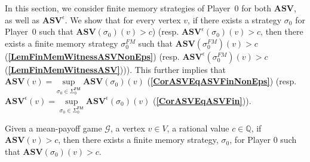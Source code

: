 In this section, we consider finite memory strategies of Player~$0$ for both $\mathbf{ASV}$, as well as $\mathbf{ASV}^\epsilon$.
We show that for every vertex $v$, if there exists a strategy $\sigma_0$ for Player~0 such that $\mathbf{ASV}(\sigma_0)(v) > c$) (resp. $\mathbf{ASV}^\epsilon(\sigma_0)(v) > c$, then there exists a finite memory strategy $\sigma_0^{FM}$ such that $\mathbf{ASV}(\sigma_0^{FM})(v) > c$ (\textbf{\cref{LemFinMemWitnessASVNonEps}}) (resp. $\mathbf{ASV}^\epsilon(\sigma_0^{FM})(v) > c$ (\textbf{\cref{LemFinMemWitnessASV}}))).
This further implies that $\mathbf{ASV}(v) = \sup\limits_{\sigma_0 \in \Sigma_0^{\mathsf{FM}}} \mathbf{ASV}(\sigma_0)(v)$ (\textbf{\cref{CorASVEqASVFinNonEps}}) (resp. $\mathbf{ASV}^\epsilon(v) = \sup\limits_{\sigma_0 \in \Sigma_0^{\mathsf{FM}}} \mathbf{ASV}^\epsilon(\sigma_0)(v)$ (\textbf{\cref{CorASVEqASVFin}})).
\begin{lemma}
\label{LemFinMemWitnessASVNonEps}
Given a mean-payoff game $\mathcal{G}$, a vertex $v \in V$, a rational value $c \in \mathbb{Q}$, if $\mathbf{ASV}(v) > c$, then there exists a finite memory strategy, $\sigma_0$, for Player 0 such that $\mathbf{ASV}(\sigma_0)(v) > c$.
\end{lemma}

